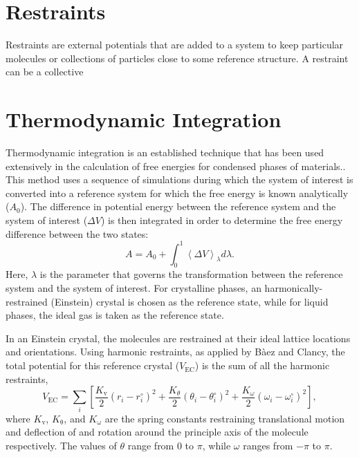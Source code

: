 \documentclass[]{book}
\begin{document}
\chapter{\label{section:restraints}Restraints}
Restraints are external potentials that are added to a system to keep
particular molecules or collections of particles close to some
reference structure.  A restraint can be a collective

\chapter{\label{section:thermInt}Thermodynamic Integration}

Thermodynamic integration is an established technique that has been
used extensively in the calculation of free energies for condensed
phases of
materials.\cite{Frenkel84,Hermens88,Meijer90,Baez95a,Vlot99}.  This
method uses a sequence of simulations during which the system of
interest is converted into a reference system for which the free
energy is known analytically ($A_0$).  The difference in potential
energy between the reference system and the system of interest
($\Delta V$) is then integrated in order to determine the free energy
difference between the two states:
\begin{equation}
 A = A_0 + \int_0^1 \left\langle \Delta V \right\rangle_\lambda
d\lambda.
\label{eq:thermInt}
\end{equation}
Here, $\lambda$ is the parameter that governs the transformation
between the reference system and the system of interest.  For
crystalline phases, an harmonically-restrained (Einstein) crystal is
chosen as the reference state, while for liquid phases, the ideal gas
is taken as the reference state.  

In an Einstein crystal, the molecules are restrained at their ideal
lattice locations and orientations. Using harmonic restraints, as
applied by B\`{a}ez and Clancy, the total potential for this reference
crystal ($V_\mathrm{EC}$) is the sum of all the harmonic restraints,
\begin{equation}
V_\mathrm{EC} = \sum_{i} \left[ \frac{K_\mathrm{v}}{2} (r_i - r_i^\circ)^2 +
\frac{K_\theta}{2} (\theta_i - \theta_i^\circ)^2 +
\frac{K_\omega}{2}(\omega_i - \omega_i^\circ)^2 \right],
\end{equation}
where $K_\mathrm{v}$, $K_\mathrm{\theta}$, and $K_\mathrm{\omega}$ are
the spring constants restraining translational motion and deflection
of and rotation around the principle axis of the molecule
respectively.  The values of $\theta$ range from $0$ to $\pi$, while
$\omega$ ranges from $-\pi$ to $\pi$.
\end{document}
